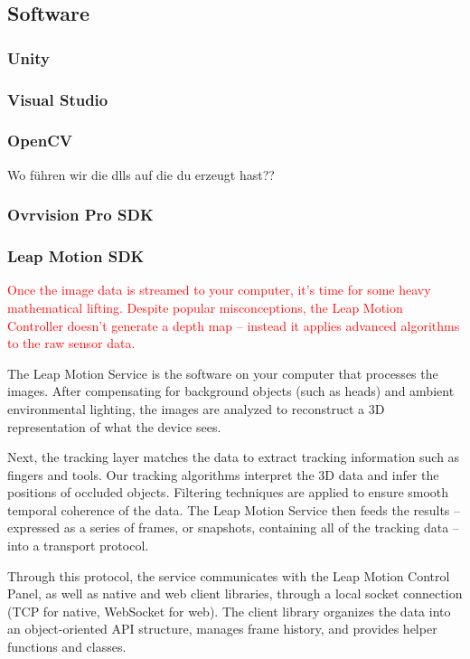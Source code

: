 \subsection{Software}
\subsubsection{Unity}\label{unity} 

\subsubsection{Visual Studio} 
\subsubsection{OpenCV} 
Wo führen wir die dlls auf die du erzeugt hast??
\subsubsection{Ovrvision Pro SDK} 
\subsubsection{Leap Motion SDK} 
\textcolor{red}{
Once the image data is streamed to your computer, it’s time for some heavy mathematical lifting. Despite popular misconceptions, the Leap Motion Controller doesn’t generate a depth map – instead it applies advanced algorithms to the raw sensor data.}

The Leap Motion Service is the software on your computer that processes the images. After compensating for background objects (such as heads) and ambient environmental lighting, the images are analyzed to reconstruct a 3D representation of what the device sees.

Next, the tracking layer matches the data to extract tracking information such as fingers and tools. Our tracking algorithms interpret the 3D data and infer the positions of occluded objects. Filtering techniques are applied to ensure smooth temporal coherence of the data. The Leap Motion Service then feeds the results – expressed as a series of frames, or snapshots, containing all of the tracking data – into a transport protocol.

Through this protocol, the service communicates with the Leap Motion Control Panel, as well as native and web client libraries, through a local socket connection (TCP for native, WebSocket for web). The client library organizes the data into an object-oriented API structure, manages frame history, and provides helper functions and classes.

